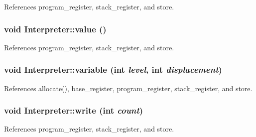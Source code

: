 References program\_\-register, stack\_\-register, and store.

\hypertarget{classInterpreter_a9dd8f6e72262517ab78d956360868dbc}{
\subsubsection[{value}]{\setlength{\rightskip}{0pt plus 5cm}void Interpreter::value ()}}
\label{classInterpreter_a9dd8f6e72262517ab78d956360868dbc}


References program\_\-register, stack\_\-register, and store.

\hypertarget{classInterpreter_ac9e99e8d7aa00928ed590354231a84fc}{
\subsubsection[{variable}]{\setlength{\rightskip}{0pt plus 5cm}void Interpreter::variable (int {\em level}, \/  int {\em displacement})}}
\label{classInterpreter_ac9e99e8d7aa00928ed590354231a84fc}


References allocate(), base\_\-register, program\_\-register, stack\_\-register, and store.

\hypertarget{classInterpreter_a59c724a616fcd6c6ac176fe53ba6b81c}{
\subsubsection[{write}]{\setlength{\rightskip}{0pt plus 5cm}void Interpreter::write (int {\em count})}}
\label{classInterpreter_a59c724a616fcd6c6ac176fe53ba6b81c}


References program\_\-register, stack\_\-register, and store.



